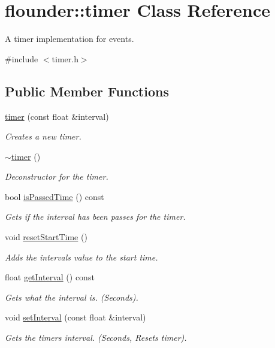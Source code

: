 \hypertarget{classflounder_1_1timer}{}\section{flounder\+:\+:timer Class Reference}
\label{classflounder_1_1timer}


A timer implementation for events.  




{\ttfamily \#include $<$timer.\+h$>$}

\subsection*{Public Member Functions}
\begin{DoxyCompactItemize}
\item 
\hyperlink{classflounder_1_1timer_a3769450a798aa0608494ef65378e096c}{timer} (const float \&interval)
\begin{DoxyCompactList}\small\item\em Creates a new timer. \end{DoxyCompactList}\item 
\hyperlink{classflounder_1_1timer_a2644c550b3bb6aa1c757287a72ff9179}{$\sim$timer} ()
\begin{DoxyCompactList}\small\item\em Deconstructor for the timer. \end{DoxyCompactList}\item 
bool \hyperlink{classflounder_1_1timer_a35d709d12d0f7f921d1f00b314d69685}{is\+Passed\+Time} () const
\begin{DoxyCompactList}\small\item\em Gets if the interval has been passes for the timer. \end{DoxyCompactList}\item 
void \hyperlink{classflounder_1_1timer_af71405c5ec11d085c91aa26d6a8d994c}{reset\+Start\+Time} ()
\begin{DoxyCompactList}\small\item\em Adds the intervals value to the start time. \end{DoxyCompactList}\item 
float \hyperlink{classflounder_1_1timer_af5c9dc96a947ba2b00e38292f6c80b06}{get\+Interval} () const
\begin{DoxyCompactList}\small\item\em Gets what the interval is. (Seconds). \end{DoxyCompactList}\item 
void \hyperlink{classflounder_1_1timer_aabfc8f4c63a88f8dc797cdc7a465b982}{set\+Interval} (const float \&interval)
\begin{DoxyCompactList}\small\item\em Gets the timers interval. (Seconds, Resets timer). \end{DoxyCompactList}\end{DoxyCompactItemize}
